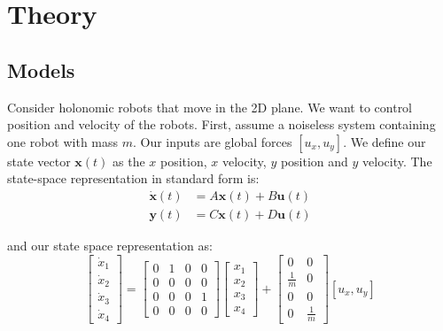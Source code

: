 \section{Theory}
\label{sec:theory}


\subsection{Models}
Consider holonomic robots that move in the 2D plane. We want to control position and velocity of the robots. 
First, assume a noiseless system containing one robot with mass $m$.
 Our inputs are global forces $[u_x,u_y]$. We define our state vector $\mathbf{x}(t)$ as the $x$ position, $x$ velocity, $y$ position and $y$ velocity.
The state-space representation in standard form is: 
\begin{align}\label{eq:stdform}
\dot{\mathbf{x}}(t)  &=  A \mathbf{x}(t) + B \mathbf{u}(t) \\
\mathbf{y}(t) &= C \mathbf{x}(t) + D \mathbf{u}(t)\nonumber 
\end{align}

and our state space representation as:
\begin{equation}
\begin{bmatrix}
\dot{x}_1\\ 
\dot{x}_2\\
\dot{x}_3\\
\dot{x}_4
\end{bmatrix} = \begin{bmatrix}
0 & 1 & 0 & 0 \\
0 & 0 & 0 & 0\\
0 & 0 & 0 & 1\\
0 & 0 & 0 & 0
\end{bmatrix}  \begin{bmatrix}
x_1\\
x_2\\
x_3\\
x_4
\end{bmatrix} + \begin{bmatrix}
0 & 0 \\
\frac{1}{m} & 0 \\
0 & 0 \\
0 & \frac{1}{m}
\end{bmatrix}  [u_x,u_y]
\end{equation}

